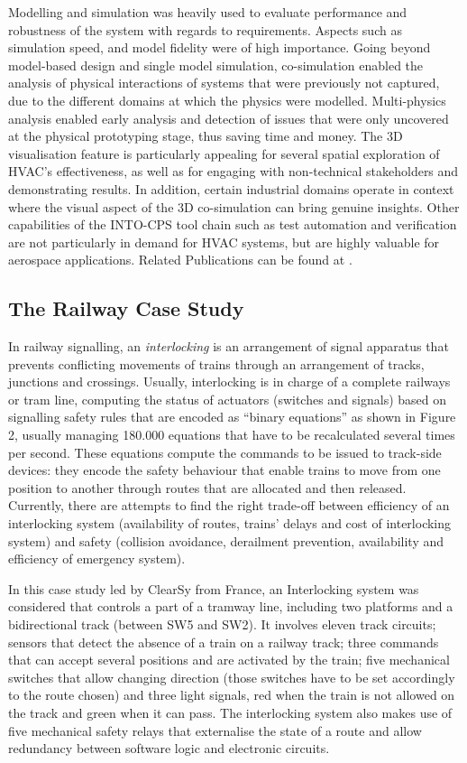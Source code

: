Modelling and simulation was heavily used to evaluate performance and robustness of the system with regards to requirements. Aspects such as simulation speed, and model fidelity were of high importance. Going beyond model-based design and single model simulation, co-simulation enabled the analysis of physical interactions of systems that were previously not captured, due to the different domains at which the physics were modelled. Multi-physics analysis enabled early analysis and detection of issues that were only uncovered at the physical prototyping stage, thus saving time and money. The 3D visualisation feature is particularly appealing for several spatial exploration of HVAC's effectiveness, as well as for engaging with non-technical stakeholders and demonstrating results. In addition, certain industrial domains operate in context where the visual aspect of the 3D co-simulation can bring genuine insights. Other capabilities of the INTO-CPS tool chain such as test automation and verification are not particularly in demand for HVAC systems, but are highly valuable for aerospace applications. Related Publications can be found at \cite{Fitzgerald&16,Couto&17}.

\subsection{The Railway Case Study}

In railway signalling, an \emph{interlocking} is an arrangement of signal apparatus that prevents conflicting movements of trains through an arrangement of tracks, junctions and crossings. Usually, interlocking is in charge of a complete railways or tram line, computing the status of actuators (switches and signals) based on signalling safety rules that are encoded as ``binary equations'' as shown in Figure 2, usually managing 180.000 equations that have to be recalculated several times per second. These equations compute the commands to be issued to track-side devices: they encode the safety behaviour that enable trains to move from one position to another through routes that are allocated and then released. Currently, there are attempts to find the right trade-off between efficiency of an interlocking system (availability of routes, trains' delays and cost of interlocking system) and safety (collision avoidance, derailment prevention, availability and efficiency of emergency system).

In this case study led by ClearSy from France, an Interlocking system was considered that controls a part of a tramway line, including two platforms and a bidirectional track (between SW5 and SW2). It involves eleven track circuits; sensors that detect the absence of a train on a railway track; three commands that can accept several positions and are activated by the train; five mechanical switches that allow changing direction (those switches have to be set accordingly to the route chosen) and three light signals, red when the train is not allowed on the track and green when it can pass. The interlocking system also makes use of five mechanical safety relays that externalise the state of a route and allow redundancy between software logic and electronic circuits.


